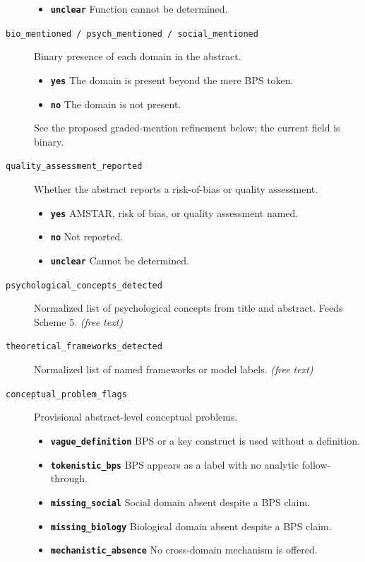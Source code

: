 \documentclass[11pt]{article}
\begin{document}
\begin{description}
\begin{itemize}[leftmargin=1.3em,itemsep=2pt,topsep=2pt]
  \item \textbf{\texttt{unclear}} Function cannot be determined.
  \end{itemize}
\item[\texttt{bio\_mentioned / psych\_mentioned / social\_mentioned}] Binary presence of each domain in the abstract.
  \begin{itemize}[leftmargin=1.3em,itemsep=2pt,topsep=2pt]
  \item \textbf{\texttt{yes}} The domain is present beyond the mere BPS token.
  \item \textbf{\texttt{no}} The domain is not present.
  \end{itemize}
{\small See the proposed graded-mention refinement below; the current field is binary.}
\item[\texttt{quality\_assessment\_reported}] Whether the abstract reports a risk-of-bias or quality assessment.
  \begin{itemize}[leftmargin=1.3em,itemsep=2pt,topsep=2pt]
  \item \textbf{\texttt{yes}} AMSTAR, risk of bias, or quality assessment named.
  \item \textbf{\texttt{no}} Not reported.
  \item \textbf{\texttt{unclear}} Cannot be determined.
  \end{itemize}
\item[\texttt{psychological\_concepts\_detected}] Normalized list of psychological concepts from title and abstract. Feeds Scheme 5. \textit{(free text)}
\item[\texttt{theoretical\_frameworks\_detected}] Normalized list of named frameworks or model labels. \textit{(free text)}
\item[\texttt{conceptual\_problem\_flags}] Provisional abstract-level conceptual problems.
  \begin{itemize}[leftmargin=1.3em,itemsep=2pt,topsep=2pt]
  \item \textbf{\texttt{vague\_definition}} BPS or a key construct is used without a definition.
  \item \textbf{\texttt{tokenistic\_bps}} BPS appears as a label with no analytic follow-through.
  \item \textbf{\texttt{missing\_social}} Social domain absent despite a BPS claim.
  \item \textbf{\texttt{missing\_biology}} Biological domain absent despite a BPS claim.
  \item \textbf{\texttt{mechanistic\_absence}} No cross-domain mechanism is offered.

\end{itemize}
\end{description}
\end{document}
